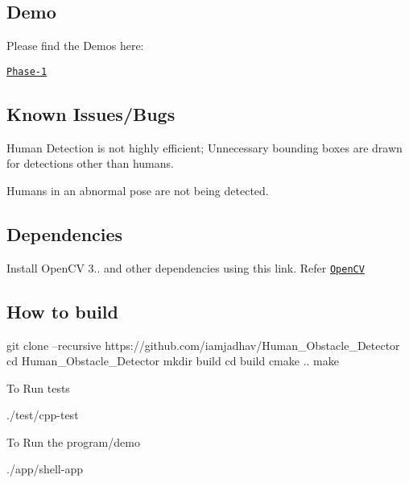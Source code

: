 \subsection*{Demo}

Please find the Demos here\+:
\begin{DoxyItemize}
\item \href{https://youtu.be/WCugv4o3ceY}{\tt Phase-\/1}
\end{DoxyItemize}

\subsection*{Known Issues/\+Bugs}


\begin{DoxyItemize}
\item Human Detection is not highly efficient; Unnecessary bounding boxes are drawn for detections other than humans.
\item Humans in an abnormal pose are not being detected.
\end{DoxyItemize}

\subsection*{Dependencies}


\begin{DoxyItemize}
\item Install Open\+CV 3.. and other dependencies using this link. Refer \href{https://learnopencv.com/install-opencv-3-4-4-on-ubuntu-18-04/}{\tt Open\+CV}
\end{DoxyItemize}

\subsection*{How to build}


\begin{DoxyCode}
git clone --recursive https://github.com/iamjadhav/Human\_Obstacle\_Detector
cd Human\_Obstacle\_Detector
mkdir build
cd build
cmake ..
make
\end{DoxyCode}


To Run tests 
\begin{DoxyCode}
./test/cpp-test
\end{DoxyCode}
 To Run the program/demo 
\begin{DoxyCode}
./app/shell-app
\end{DoxyCode}



